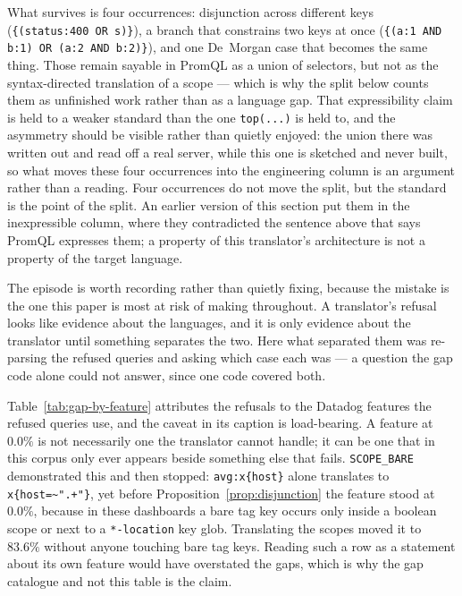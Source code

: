 What survives is four occurrences: disjunction across
different keys (\texttt{\{(status:400 OR s)\}}), a branch that constrains two keys at
once (\texttt{\{(a:1 AND b:1) OR (a:2 AND b:2)\}}), and one De~Morgan case that becomes
the same thing. Those remain sayable in PromQL as a union of selectors, but not as the
syntax-directed translation of a scope --- which is why the split below counts them as
unfinished work rather than as a language gap. That expressibility claim is held to a
weaker standard than the one \texttt{top(...)} is held to, and
the asymmetry should be visible rather than quietly enjoyed: the union there was
written out and read off a real server, while this one is sketched and never built, so
what moves these four occurrences into the engineering column is an argument rather
than a reading. Four occurrences do not move the split, but the standard is the point
of the split. An earlier version of this section put
them in the inexpressible column, where they contradicted the sentence above that says
PromQL expresses them; a property of this translator's architecture is not a property
of the target language.

The episode is worth recording rather than quietly fixing, because the mistake is the
one this paper is most at risk of making throughout. A translator's refusal looks like
evidence about the languages, and it is only evidence about the translator until
something separates the two. Here what separated them was re-parsing the refused queries
and asking which case each was --- a question the gap code alone could not answer, since
one code covered both.

\begin{table}[htbp]\centering\footnotesize

\caption{The twelve features with the lowest translated share, among those appearing in
at least $50$ query occurrences. Rows read ``queries using this feature'', not ``this
feature''.}
\label{tab:gap-by-feature}
\end{table}

Table~\ref{tab:gap-by-feature} attributes the refusals to the Datadog features the
refused queries use, and the caveat in its caption is load-bearing. A feature at $0.0\%$
is not necessarily one the translator cannot handle; it can be one that in this corpus
only ever appears beside something else that fails. \texttt{SCOPE\_BARE} demonstrated
this and then stopped: \texttt{avg:x\{host\}} alone translates to
\texttt{x\{host=\textasciitilde{}".+"\}}, yet before
Proposition~\ref{prop:disjunction} the feature stood at $0.0\%$, because in these
dashboards a bare tag key occurs only inside a boolean scope or next to a
\texttt{*-location} key glob. Translating the scopes moved it to $83.6\%$ without anyone
touching bare tag keys. Reading such a row as a statement about its own feature would
have overstated the gaps, which is why the gap catalogue and not this table is the
claim.

